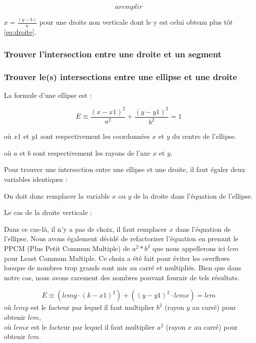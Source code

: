 \documentclass[]{article}
\begin{document}
\begin{equation} \label{eq:internv}
	a remplir
\end{equation}

$ x = \frac {(y - b)}{ a} $ pour une droite non verticale
dont le y est celui obtenu plus tôt \eqref{eq:droite}.

\subsubsection{Trouver l'intersection entre une droite et un segment}

\subsubsection{Trouver le(s) intersections entre une ellipse et une droite}

La formule d'une ellipse est : 

$$ E \equiv \frac{(x - x1)^2}{a^2} + \frac{(y - y1)^2}{b^2} = 1 $$

\begin{description}
\item où $x1$ et $y1$ sont respectivement les coordonnées
$x$ et $y$ du centre de l'ellipse. \\
\item où $a$ et $b$ sont respectivement les rayons de l'axe
$x$ et $y$. \\
\end{description}

Pour trouver une intersection entre une ellipse
et une droite, il faut égaler deux variables 
identiques :


On doit donc remplacer la variable $x$ ou $y$ de la droite dans
l'équation de l'ellipse.

Le cas de la droite verticale : 

Dans ce cas-là, il n'y a pas de choix, il faut remplacer
$x$ dans l'équation de l'ellipse.
Nous avons également décidé de refactoriser l'équation en 
prenant le PPCM (Plus Petit Commun Multiple) de $a^2 * b^2$ que
nous appellerons ici $lcm$ pour Least Commun Multiple.
Ce choix a été fait pour éviter les overflows lorsque 
de nombres trop grands sont mis au carré et multipliés.
Bien que dans notre cas, nous avons rarement des nombres
pouvant fournir de tels résultats.

$$ E \equiv (lcmy \cdot (k - x1)^2) + ((y - y1)^2 \cdot lcmx) = lcm $$  
où $lcmy$ est le facteur par lequel il faut multiplier
$b^2$ (rayon $y$ au carré) pour obtenir $lcm$, \\
où $lcmx$ est le facteur par lequel il faut multiplier
$a^2$ (rayon $x$ au carré) pour obtenir $lcm$.
\end{document}

